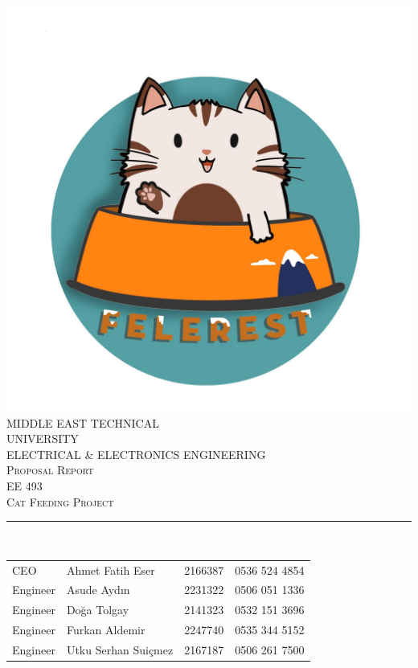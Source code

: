 \begin{titlepage}
	\centering 
    \vspace*{-3.5 cm}
    \includegraphics[scale = 0.15]{img/FelerestLogo.jpeg}\\[0.5 cm]	
    \textsc{\Large MIDDLE EAST TECHNICAL} \\[0.2 cm]
    \textsc{\Large UNIVERSITY} \\ [1.0 cm]
    \textsc{\large ELECTRICAL \& ELECTRONICS ENGINEERING} \\[0.2 cm]
    \textsc{\large Proposal Report}\\[0.2 cm]
	\textsc{\large EE 493}\\[0.5 cm]
	
	\textsc{\large Cat Feeding Project}\\[0.2 cm]
	\rule{\linewidth}{0.2 mm} \\[0.2 cm]

\begin{table}[h]
\centering
\begin{tabular}{l | l | c | c} 
 CEO & Ahmet Fatih Eser & 2166387 & 0536 524 4854  \\
 Engineer & Asude Aydın & 2231322 & 0506 051 1336  \\
 Engineer & Doğa Tolgay & 2141323 & 0532 151 3696  \\
 Engineer & Furkan Aldemir & 2247740 & 0535 344 5152  \\
 Engineer & Utku Serhan Suiçmez & 2167187 & 0506 261 7500  \\
\end{tabular}
\label{table:1}
\end{table}


\end{titlepage}
